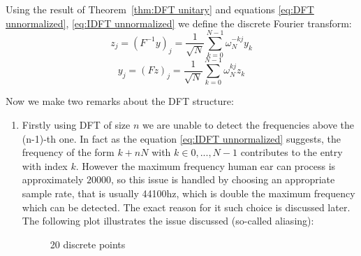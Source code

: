 Using the result of Theorem~\ref{thm:DFT unitary} and equations \eqref{eq:DFT unnormalized}, \eqref{eq:IDFT unnormalized} we define the discrete Fourier transform:
\begin{equation}
	z_j
	= {(F^{-1}y)}_j
	= \frac{1}{\sqrt{N}}\sum_{k =0}^{N-1} \omega_N^{-kj} y_k
	\label{eq:DFT} \tag{DFT}
\end{equation}
\begin{equation}
	y_j
	= {(Fz)}_j
	= \frac{1}{\sqrt{N}}\sum_{k =0}^{N-1} \omega_N^{kj} z_k
	\label{eq:IDFT} \tag{IDFT}
\end{equation}

\begin{remark}
	Now we make two remarks about the DFT structure:
	\begin{enumerate}[label = \theremark.\arabic*]
		\item Firstly using DFT of size $n$ we are unable to detect the frequencies above the (n-1)-th one. In fact as the equation \eqref{eq:IDFT unnormalized} suggests, the frequency of the form $k+nN$ with $k\in {0, ..., N-1}$ contributes to the entry with index $k$. However the maximum frequency human ear can process is approximately $20000$, so this issue is handled by choosing an appropriate sample rate, that is usually 44100hz, which is double the maximum frequency which can be detected. The exact reason for it such choice is discussed later. The following plot illustrates the issue discussed (so-called aliasing):
		      \begin{figure}[htbp]
			      \centering

			      \caption{20 discrete points}

\end{figure}
\end{enumerate}
\end{remark}
